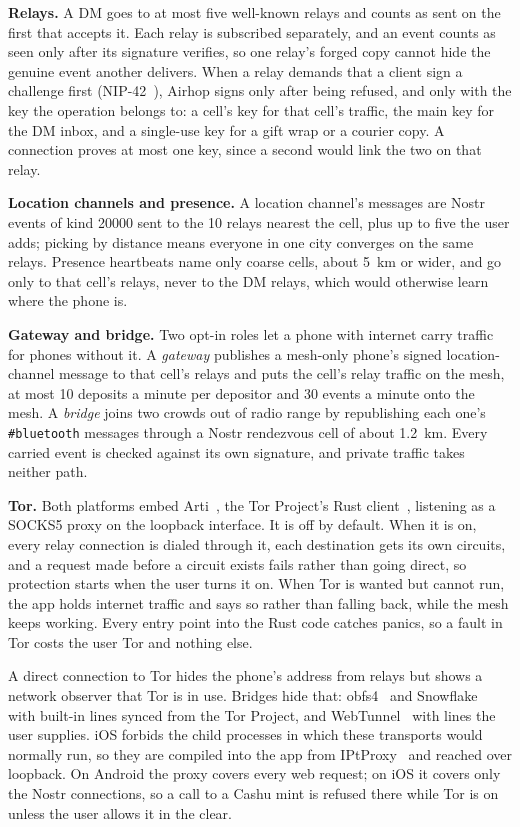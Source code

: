 \documentclass[conference]{IEEEtran}
\newcommand{\code}[1]{\texttt{#1}}
\begin{document}
\textbf{Relays.} A DM goes to at most five well-known relays and counts as sent on the first that accepts it. Each relay is subscribed separately, and an event counts as seen only after its signature verifies, so one relay's forged copy cannot hide the genuine event another delivers. When a relay demands that a client sign a challenge first (NIP-42~\cite{nip42}), Airhop signs only after being refused, and only with the key the operation belongs to: a cell's key for that cell's traffic, the main key for the DM inbox, and a single-use key for a gift wrap or a courier copy. A connection proves at most one key, since a second would link the two on that relay.

\textbf{Location channels and presence.} A location channel's messages are Nostr events of kind 20000 sent to the 10 relays nearest the cell, plus up to five the user adds; picking by distance means everyone in one city converges on the same relays. Presence heartbeats name only coarse cells, about 5~km or wider, and go only to that cell's relays, never to the DM relays, which would otherwise learn where the phone is.

\textbf{Gateway and bridge.} Two opt-in roles let a phone with internet carry traffic for phones without it. A \emph{gateway} publishes a mesh-only phone's signed location-channel message to that cell's relays and puts the cell's relay traffic on the mesh, at most 10 deposits a minute per depositor and 30 events a minute onto the mesh. A \emph{bridge} joins two crowds out of radio range by republishing each one's \code{\#bluetooth} messages through a Nostr rendezvous cell of about 1.2~km. Every carried event is checked against its own signature, and private traffic takes neither path.

\textbf{Tor.} Both platforms embed Arti~\cite{arti}, the Tor Project's Rust client~\cite{tor2004}, listening as a SOCKS5 proxy on the loopback interface. It is off by default. When it is on, every relay connection is dialed through it, each destination gets its own circuits, and a request made before a circuit exists fails rather than going direct, so protection starts when the user turns it on. When Tor is wanted but cannot run, the app holds internet traffic and says so rather than falling back, while the mesh keeps working. Every entry point into the Rust code catches panics, so a fault in Tor costs the user Tor and nothing else.

A direct connection to Tor hides the phone's address from relays but shows a network observer that Tor is in use. Bridges hide that: obfs4~\cite{obfs4} and Snowflake~\cite{snowflake2024} with built-in lines synced from the Tor Project, and WebTunnel~\cite{webtunnel} with lines the user supplies. iOS forbids the child processes in which these transports would normally run, so they are compiled into the app from IPtProxy~\cite{iptproxy} and reached over loopback. On Android the proxy covers every web request; on iOS it covers only the Nostr connections, so a call to a Cashu mint is refused there while Tor is on unless the user allows it in the clear.
\end{document}
